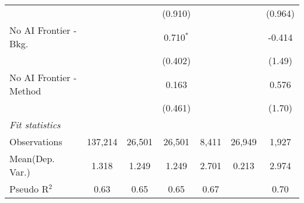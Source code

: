 \begin{tabular}{lcccccc}
                           &          &         & (0.910)     &               &        & (0.964)\\   
   No AI Frontier - Bkg.   &          &         & 0.710$^{*}$ &               &        & -0.414\\   
                           &          &         & (0.402)     &               &        & (1.49)\\   
   No AI Frontier - Method &          &         & 0.163       &               &        & 0.576\\   
                           &          &         & (0.461)     &               &        & (1.70)\\   
   \midrule
   \emph{Fit statistics}\\
   Observations            & 137,214  & 26,501  & 26,501      & 8,411         & 26,949 & 1,927\\  
Mean(Dep. Var.) & 1.318 & 1.249 & 1.249 & 2.701 & 0.213 & 2.974 \\
   Pseudo R$^2$            & 0.63     & 0.65    & 0.65        & 0.67          &        & 0.70\\  
   

\end{tabular}
